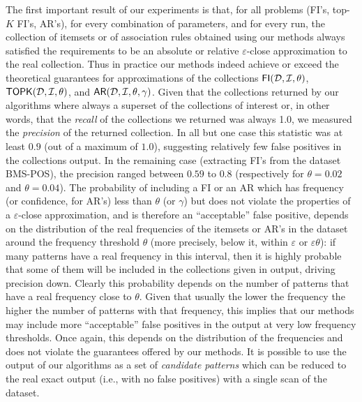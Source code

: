 The first important result of our experiments is that, for all problems (FI's,
top-$K$ FI's, AR's), for every combination of parameters, and for every run, the
collection of itemsets or of association rules obtained using our methods always
satisfied the requirements to be an absolute or relative $\varepsilon$-close
approximation to the real collection. Thus in practice our methods indeed
achieve or exceed the theoretical guarantees for approximations of the
collections $\mathsf{FI}({\cal D},{\cal I},\theta)$, $\mathsf{TOPK}({\cal D},{\cal I},\theta)$, and
$\mathsf{AR}({\cal D},{\cal I},\theta,\gamma)$.  
Given that the collections returned by our algorithms where always a superset of
the collections of interest or, in other words, that the \emph{recall} of the
collections we returned was always 1.0, we measured the \emph{precision} of the
returned collection. In all but one case this statistic was at least $0.9$ (out
of a maximum of $1.0$), suggesting relatively few false positives in the
collections output. In the remaining case (extracting FI's from the dataset
BMS-POS), the precision ranged between $0.59$ to $0.8$ (respectively for
$\theta=0.02$ and $\theta=0.04$). The
probability of including a FI or an AR which has frequency (or confidence, for
AR's) less than $\theta$ (or $\gamma$) but does not violate the properties of a
$\varepsilon$-close approximation, and is therefore an
``acceptable'' false positive, depends on the distribution of the
real frequencies of the itemsets or AR's in the dataset around the frequency
threshold $\theta$ (more precisely, below it, within $\varepsilon$ or
$\varepsilon\theta$): if many patterns have a real frequency in this interval,
then it is highly probable that some of them will be included in the collections
given in output, driving precision down. Clearly this probability depends on the
number of patterns that have a real frequency close to $\theta$. Given that
usually the lower the frequency the higher the number of patterns with that
frequency, this implies that our methods may include more ``acceptable'' false
positives in the output at very low frequency thresholds. Once again, this
depends on the distribution of the frequencies and does not violate the
guarantees offered by our methods. It is possible to use the output of our
algorithms as a set of \emph{candidate patterns} which can be reduced to the
real exact output (i.e., with no false positives) with a single scan of the
dataset.

